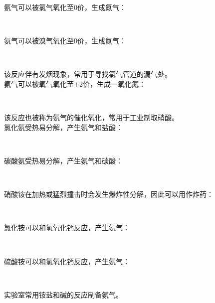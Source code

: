 \documentclass[UTF8]{ctexart}
\begin{document}
\newpage

    氨气可以被氯气氧化至$0$价，生成氮气：
    \begin{center}
        \\[4mm]
    \end{center}
    氨气可以被溴气氧化至$0$价，生成氮气：
    \begin{center}
        \\[4mm]
    \end{center}
    该反应伴有发烟现象，常用于寻找氯气管道的漏气处。\\[4mm]
    氨气可以被氧气氧化至$+2$价，生成一氧化氮：
    \begin{center}
        \\[4mm]
    \end{center}
    该反应也被称为氨气的催化氧化，常用于工业制取硝酸。\\[10mm]
    氯化氨受热易分解，产生氨气和盐酸：
    \begin{center}
        \\[4mm]
    \end{center}
    碳酸氨受热易分解，产生氨气和碳酸：
    \begin{center}
        \\[4mm]
    \end{center}
    硝酸铵在加热或猛烈撞击时会发生爆炸性分解，因此可以用作炸药：
    \begin{center}
        \\[10mm]
    \end{center}
    氯化铵可以和氢氧化钙反应，产生氨气：
    \begin{center}
        \\[4mm]
    \end{center}
    硫酸铵可以和氢氧化钙反应，产生氨气：
    \begin{center}
        \\[6mm]
    \end{center}
    实验室常用铵盐和碱的反应制备氨气。

\newpage
\end{document}
